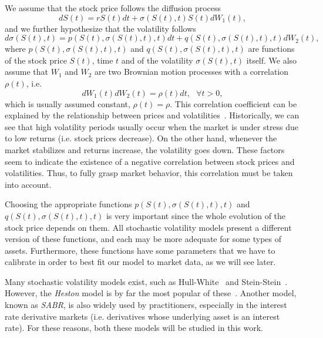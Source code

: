 We assume that the stock price follows the diffusion process
\begin{equation}\label{stochvol}
dS(t)=rS(t)dt+\sigma(S(t),t)S(t)dW_1(t),
\end{equation}
\noindent and we further hypothesize that the volatility follows
\begin{equation}
d\sigma(S(t),t)=p(S(t),\sigma(S(t),t),t)dt+q(S(t),\sigma(S(t),t),t)dW_2(t),
\end{equation}
\noindent where $p(S(t),\sigma(S(t),t),t)$ and $q(S(t),\sigma(S(t),t),t)$ are functions of the stock price $S(t)$, time $t$ and of the volatility $\sigma(S(t),t)$ itself. We also assume that $W_1$ and $W_2$ are two Brownian motion processes with a correlation $\rho(t)$, i.e.
\begin{equation}
dW_1(t)dW_2(t)=\rho(t) dt, \ \ \ \forall t>0,
\end{equation}
\noindent which is usually assumed constant, $\rho(t)=\rho$. This correlation coefficient can be explained by the relationship between prices and volatilities~\citep{chourdakis}. Historically, we can see that high volatility periods usually occur when the market is under stress due to low returns (i.e. stock prices decrease).
On the other hand, whenever the market stabilizes and returns increase, the volatility goes down.
These factors seem to indicate the existence of a negative correlation between stock prices and volatilities. Thus, to fully grasp market behavior, this correlation must be taken into account.



Choosing the appropriate functions $p(S(t),\sigma(S(t),t),t)$ and $q(S(t),\sigma(S(t),t),t)$ is very important since the whole evolution of the stock price depends on them. All stochastic volatility models present a different version of these functions, and each may be more adequate for some types of assets. Furthermore, these functions have some parameters that we have to calibrate in order to best fit our model to market data, as we will see later.


Many stochastic volatility models exist, such as Hull-White~\citep{hullwhite} and Stein-Stein~\citep{stein}. However, the \emph{Heston} model is by far the most popular of these~\citep{chourdakis}.
Another model, known as \emph{SABR}, is also widely used by practitioners, especially in the interest rate derivative markets (i.e. derivatives whose underlying asset is an interest rate). For these reasons, both these models will be studied in this work.


